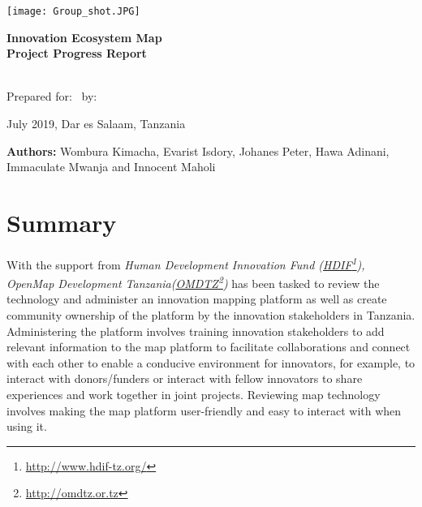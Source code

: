 \documentclass[a4paper,12pt,twoside]{article}
\begin{document}
\thispagestyle{empty}

\begin{center}
\texttt{[image: Group\_shot.JPG]}
\end{center}

\begin{center}
\bigskip
  \Huge 
\color{OMDTZblue} \textbf {Innovation Ecosystem Map}
\\
\textbf{Project Progress Report}
\\
\end{center}
\bigskip \bigskip \bigskip
\\
  \vbox{
  \centering
  Prepared for:
  \
  by:
}
\bigskip  \bigskip \bigskip
\begin{center}
  July 2019, Dar es Salaam, Tanzania  
  
 \bigskip \bigskip \bigskip \bigskip \bigskip \bigskip
\end{center}
 
\begin{flushleft}
	\footnotesize {\textbf{Authors:} Wombura Kimacha, Evarist Isdory, Johanes Peter, Hawa Adinani, Immaculate Mwanja and { } { } { } { } { } { } Innocent Maholi}
\end{flushleft} 
  

\newpage
\tableofcontents

\newpage
\section{Summary}
With the support from \textit{Human Development Innovation Fund (\href{http://www.hdif-tz.org/}{HDIF}\footnote{\url{http://www.hdif-tz.org/}}), OpenMap Development Tanzania(\href{http://omdtz.or.tz}{OMDTZ}\footnote{\url{http://omdtz.or.tz}})} has been tasked to review the technology and administer an innovation mapping platform as well as create community ownership of the platform by the innovation stakeholders in Tanzania. Administering the platform involves training innovation stakeholders to add relevant information to the map platform to facilitate collaborations and connect with each other to enable a conducive environment for innovators, for example, to interact with donors/funders or interact with fellow innovators to share experiences and work together in joint projects. Reviewing map technology involves making the map platform user-friendly and easy to interact with when using it.
\end{document}
